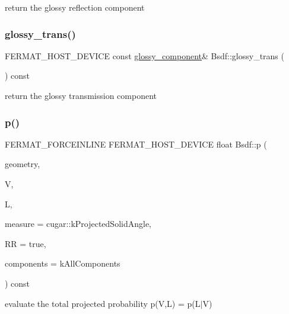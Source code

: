 return the glossy reflection component \mbox{\label{struct_bsdf_a40f0038a911021c5f3748ce8f51ac14c}} 
\subsubsection{\texorpdfstring{glossy\+\_\+trans()}{glossy\_trans()}}
{\footnotesize\ttfamily F\+E\+R\+M\+A\+T\+\_\+\+H\+O\+S\+T\+\_\+\+D\+E\+V\+I\+CE const \hyperlink{structcugar_1_1_g_g_x_smith_bsdf}{glossy\+\_\+component}\& Bsdf\+::glossy\+\_\+trans (\begin{DoxyParamCaption}{ }\end{DoxyParamCaption}) const\hspace{0.3cm}{\ttfamily [inline]}}

return the glossy transmission component \mbox{\label{struct_bsdf_a88c3b1f89a3248d4b2684fd402a59ced}} 
\subsubsection{\texorpdfstring{p()}{p()}}
{\footnotesize\ttfamily F\+E\+R\+M\+A\+T\+\_\+\+F\+O\+R\+C\+E\+I\+N\+L\+I\+NE F\+E\+R\+M\+A\+T\+\_\+\+H\+O\+S\+T\+\_\+\+D\+E\+V\+I\+CE float Bsdf\+::p (\begin{DoxyParamCaption}\item[{const \hyperlink{structcugar_1_1_differential_geometry}{cugar\+::\+Differential\+Geometry} \&}]{geometry,  }\item[{const \hyperlink{structcugar_1_1_vector}{cugar\+::\+Vector3f}}]{V,  }\item[{const \hyperlink{structcugar_1_1_vector}{cugar\+::\+Vector3f}}]{L,  }\item[{const cugar\+::\+Spherical\+Measure}]{measure = {\ttfamily cugar\+:\+:kProjectedSolidAngle},  }\item[{const bool}]{RR = {\ttfamily true},  }\item[{const \hyperlink{struct_bsdf_a5f7db6f81220ed9ee6da109d6eb5b585}{Component\+Type}}]{components = {\ttfamily kAllComponents} }\end{DoxyParamCaption}) const\hspace{0.3cm}{\ttfamily [inline]}}

evaluate the total projected probability p(\+V,\+L) = p(L$\vert$V)


